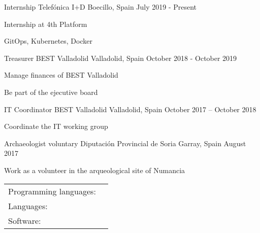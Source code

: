 \documentclass[]{awesome-cv}
\begin{document}
\vspace{-2mm}
\begin{cventries}
	\cventry
	{Internship}
	{Telefónica I+D}
	{Boecillo, Spain}
	{July 2019 - Present}
	{\begin{cvitems}
		\item {Internship at 4th Platform}
		\item {GitOps, Kubernetes, Docker}
	\end{cvitems}
	}
	\cventry
	{Treasurer}
	{BEST Valladolid}
	{Valladolid, Spain}
	{October 2018 - October 2019}
	{\begin{cvitems}
		\item {Manage finances of BEST Valladolid}
		\item {Be part of the ejecutive board}
		\end{cvitems}}
	\cventry
	{IT Coordinator}
	{BEST Valladolid}
	{Valladolid, Spain}
	{October 2017 – October 2018}
	{\begin{cvitems}
		\item {Coordinate the IT working group}
		\end{cvitems}}
	\cventry
	{Archaeologist voluntary}
	{Diputación Provincial de Soria}
	{Garray, Spain}
	{August 2017}
	{\begin{cvitems}
		\item {Work as a volunteer in the arqueological site of Numancia}
		\end{cvitems}}
\end{cventries}
\begin{cventries}
	\cventry
	{}
	{\def\arraystretch{1.15}{\begin{tabular}{ l l }
		Programming languages:  & {\skill{ Rust, C, Python, Java, JavaScript, SQL, Prolog, Terraform}} \\
		Languages:  & {\skill{ Spanish (native), English ( FIRST B2)}} \\
		Software: & {\skill{Linux, Kubernetes, Docker, Azure, AWS, \LaTeX , PostgreSQL, Microsoft Office, Git}} \\
		\end{tabular}}}
	{}
	{}
	{}
\end{cventries}
\end{document}
